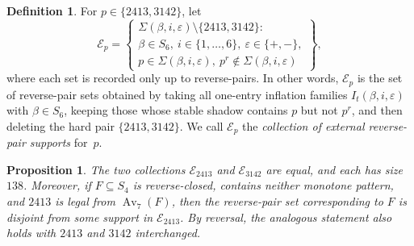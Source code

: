 \documentclass[11pt]{amsart}
\newcommand{\Sym}{S}
\newcommand{\Av}{\operatorname{Av}}
\theoremstyle{plain}
\newtheorem{proposition}[theorem]{Proposition}
\theoremstyle{definition}
\newtheorem{definition}[theorem]{Definition}
\theoremstyle{remark}
\begin{document}
\begin{definition}\label{def:external-supports}
  For $p \in \{2413,3142\}$, let
  \[
    \mathcal{E}_p=
    \left\{
    \begin{array}{l}
      \Sigma(\beta,i,\varepsilon)\setminus\{2413,3142\}:           \\
      \beta\in \Sym_6,\ i\in\{1,\dots,6\},\ \varepsilon\in\{+,-\}, \\
      p \in \Sigma(\beta,i,\varepsilon),\ p^r \notin \Sigma(\beta,i,\varepsilon)
    \end{array}
    \right\},
  \]
  where each set is recorded only up to reverse-pairs.  In other words, $\mathcal{E}_p$ is the set
  of reverse-pair sets obtained by taking all one-entry inflation families
  $I_t(\beta,i,\varepsilon)$ with $\beta\in\Sym_6$, keeping those whose stable shadow contains $p$
  but not $p^r$, and then deleting the hard pair $\{2413,3142\}$.  We call $\mathcal{E}_p$ the
  \emph{collection of external reverse-pair supports} for~$p$.
\end{definition}

\begin{proposition}\label{prop:hard-pair-families}
  The two collections $\mathcal{E}_{2413}$ and $\mathcal{E}_{3142}$ are equal, and each has size
  $138$.  Moreover, if $F \subseteq \Sym_4$ is reverse-closed, contains neither monotone pattern, and
  $2413$ is legal from $\Av_7(F)$, then the reverse-pair set corresponding to $F$ is disjoint from
  some support in $\mathcal{E}_{2413}$.  By reversal, the analogous statement also holds with $2413$
  and $3142$ interchanged.
\end{proposition}
\end{document}
